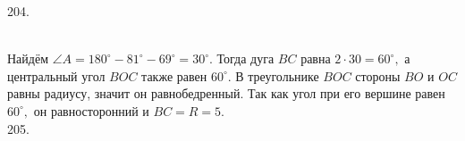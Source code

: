 \documentclass[12pt]{article}
\begin{document}
204. \begin{figure}[ht!]
\end{figure}\\
Найдём $\angle A=180^\circ-81^\circ-69^\circ=30^\circ.$ Тогда дуга $BC$ равна $2\cdot30=60^\circ,$ а центральный угол $BOC$ также равен $60^\circ.$ В треугольнике $BOC$ стороны $BO$ и $OC$ равны радиусу, значит он равнобедренный. Так как угол при его вершине равен $60^\circ,$ он равносторонний и $BC=R=5.$\\
205. \begin{figure}[ht!]
\end{figure}\\
\end{document}
